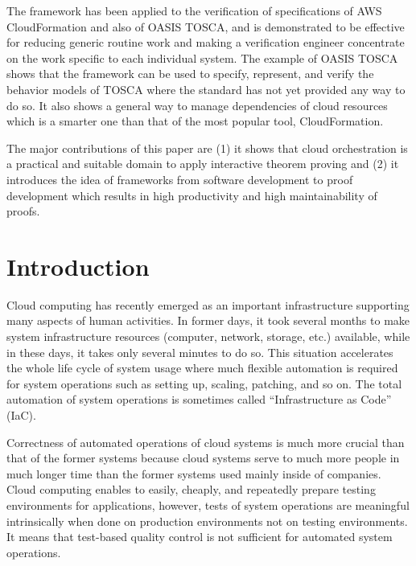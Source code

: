 \documentclass[12pt]{report}
\begin{document}
The framework has been applied to the verification of specifications
of AWS CloudFormation and also of OASIS TOSCA, and is demonstrated to
be effective for reducing generic routine work and making a
verification engineer concentrate on the work specific to each
individual system. The example of OASIS TOSCA shows that the framework
can be used to specify, represent, and verify the behavior models of
TOSCA where the standard has not yet provided any way to do so. It
also shows a general way to manage dependencies of cloud resources
which is a smarter one than that of the most popular tool,
CloudFormation.

The major contributions of this paper are (1) it shows that cloud
orchestration is a practical and suitable domain to apply interactive
theorem proving and (2) it introduces the idea of frameworks from
software development to proof development which results in high
productivity and high maintainability of proofs.


\tableofcontents
\listoffigures
\newpage
{}
\setcounter{page}{1}

\chapter{Introduction}
Cloud computing has recently emerged as an important infrastructure
supporting many aspects of human activities. In former days, it took
several months to make system infrastructure resources (computer,
network, storage, etc.) available, while in these days, it takes only
several minutes to do so. This situation accelerates the whole life
cycle of system usage where much flexible automation is required for
system operations such as setting up, scaling, patching, and so on.
The total automation of system operations is sometimes called
``Infrastructure as Code'' (IaC).

Correctness of automated operations of cloud systems is much more
crucial than that of the former systems because cloud systems serve to
much more people in much longer time than the former systems used
mainly inside of companies. Cloud computing enables to easily,
cheaply, and repeatedly prepare testing environments for applications,
however, tests of system operations are meaningful intrinsically when
done on production environments not on testing environments.  It means
that test-based quality control is not sufficient for automated
system operations.
\end{document}
